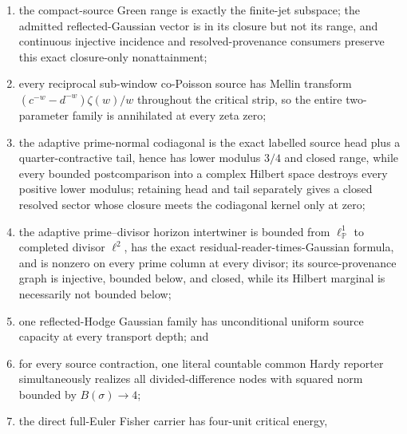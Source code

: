 \documentclass[11pt]{article}
\theoremstyle{definition}
\theoremstyle{remark}
\begin{document}
\begin{enumerate}[leftmargin=2.2em]
      M\"obius--Gaussian Neumann source on its absolute-convergence chamber,
      and its completed Gamma/Green residue is fixed and nonzero; the
      unweighted residue packet is not square-summable, and every weighted
      admission is exactly an independent square-summable horizon grade; a
      fixed reflected Meyer Gaussian supplies a pointwise nonzero,
      reflection-compatible such grade, an admitted packet, and a nonzero
      resolved quotient class at every displacement, but its norm has no
      uniform positive lower bound; its completed Green fracture gives one
      global vector \(g_G\) satisfying \(g_G=0\Longleftrightarrow\mathrm{RH}\);
\item the compact-source Green range is exactly the finite-jet subspace;
      the admitted reflected-Gaussian vector is in its closure but not its
      range, and continuous injective incidence and resolved-provenance
      consumers preserve this exact closure-only nonattainment;
\item every reciprocal sub-window co-Poisson source has Mellin transform
      \((c^{-w}-d^{-w})\zeta(w)/w\) throughout the critical strip, so the
      entire two-parameter family is annihilated at every zeta zero;
\item the adaptive prime-normal codiagonal is the exact labelled source head
      plus a quarter-contractive tail, hence has lower modulus \(3/4\) and
      closed range, while every bounded postcomparison into a complex
      Hilbert space destroys every positive lower modulus; retaining head
      and tail separately gives a closed resolved sector whose closure meets
      the codiagonal kernel only at zero;
\item the adaptive prime--divisor horizon intertwiner is bounded from
      \(\ell^1_{\mathbb P}\) to completed divisor \(\ell^2\), has the exact
      residual-reader-times-Gaussian formula, and is nonzero on every prime
      column at every divisor; its source-provenance graph is injective,
      bounded below, and closed, while its Hilbert marginal is necessarily
      not bounded below;
\item one reflected-Hodge Gaussian family has unconditional uniform source
      capacity at every transport depth; and
\item for every source contraction, one literal countable common Hardy
      reporter simultaneously realizes all divided-difference nodes with
      squared norm bounded by \(B(\sigma)\to4\);
\item the direct full-Euler Fisher carrier has four-unit critical energy,

\end{enumerate}
\end{document}
